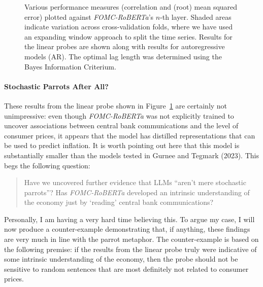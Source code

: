 \documentclass{article}
\theoremstyle{plain}
\theoremstyle{definition}
\theoremstyle{remark}
\begin{document}
\begin{figure}


\caption{\label{fig-fomc}Various performance measures (correlation and
(root) mean squared error) plotted against \emph{FOMC-RoBERTa}'s
\(n\)-th layer. Shaded areas indicate variation across cross-validation
folds, where we have used an expanding window approach to split the time
series. Results for the linear probes are shown along with results for
autoregressive models (AR). The optimal lag length was determined using
the Bayes Information Criterium.}

\end{figure}%

\paragraph{Stochastic Parrots After
All?}\label{stochastic-parrots-after-all}

These results from the linear probe shown in Figure~\ref{fig-fomc} are
certainly not unimpressive: even though \emph{FOMC-RoBERTa} was not
explicitly trained to uncover associations between central bank
communications and the level of consumer prices, it appears that the
model has distilled representations that can be used to predict
inflation. It is worth pointing out here that this model is
substantially smaller than the models tested in Gurnee and Tegmark
(2023). This begs the following question:

\begin{quote}
Have we uncovered further evidence that LLMs ``aren't mere stochastic
parrots''? Has \emph{FOMC-RoBERTa} developed an intrinsic understanding
of the economy just by `reading' central bank communications?
\end{quote}

Personally, I am having a very hard time believing this. To argue my
case, I will now produce a counter-example demonstrating that, if
anything, these findings are very much in line with the parrot metaphor.
The counter-example is based on the following premise: if the results
from the linear probe truly were indicative of some intrinsic
understanding of the economy, then the probe should not be sensitive to
random sentences that are most definitely not related to consumer
prices.
\end{document}

